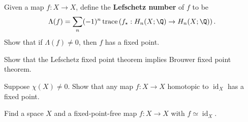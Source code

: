 \documentclass[12pt]{pset}
\DeclareMathOperator{\trace}{trace}
\DeclareMathOperator{\id}{id}
\begin{document}
\begin{problem}
  Given a map $f : X \to X$, define the \textbf{Lefschetz number} of
  $f$ to be
  $$
  \Lambda(f) = \sum_n (-1)^n \trace \left(f_\star : H_n(X;\Q) \to H_n(X;\Q) \right).
  $$
  Show that if $\Lambda(f) \neq 0$, then $f$ has a fixed point.
\end{problem}

\begin{problem}
  Show that the Lefschetz fixed point theorem implies Brouwer fixed
  point theorem.
\end{problem}

\begin{problem}
  Suppose $\chi(X) \neq 0$.  Show that any map $f : X \to X$ homotopic
  to $\id_X$ has a fixed point.
\end{problem}

\begin{problem}
  Find a space $X$ and a fixed-point-free map $f : X \to X$ with $f \simeq \id_X$.
\end{problem}
\end{document}
